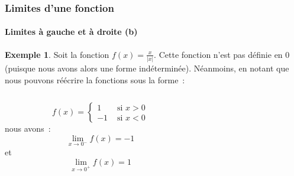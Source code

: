 \documentclass[10pt,notheorems]{beamer}
\theoremstyle{plain}
\theoremstyle{definition} %
\newtheorem{example}{Exemple}
\begin{document}
\begin{frame}
  \frametitle{Limites d'une fonction}
  \framesubtitle{Limites à gauche et à droite (b)}

  \begin{example}

    Soit la fonction  $f(x) = \frac{x}{|x|}$. Cette fonction n'est pas définie en 0 (puisque nous avons alors une forme indéterminée). Néanmoins, en notant que nous pouvons réécrire la fonctions sous la forme~:
    \begin{columns}[onlytextwidth]
      \begin{column}{.5\textwidth}
        \[
          f(x) =
          \begin{cases}
            1 &\text{ si } x>0\\
            -1 &\text{ si } x<0
          \end{cases}
        \]
        nous avons~:
        \[
          \lim_{x\rightarrow 0^-} f(x) = -1
        \]
        et
        \[
          \lim_{x\rightarrow 0^+} f(x) = 1
        \]
      \end{column}
      \begin{column}{.5\textwidth}
      \end{column}
    \end{columns}
  \end{example}

\end{frame}
\end{document}
